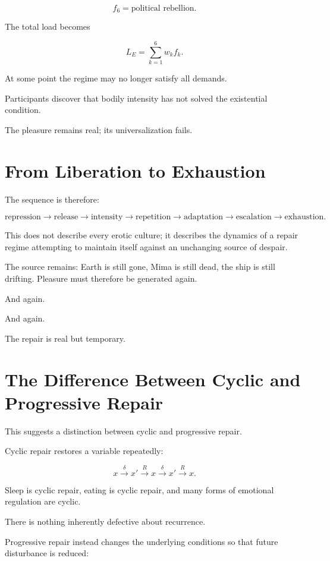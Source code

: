 \documentclass[11pt,oneside]{book}
\theoremstyle{definition}
\theoremstyle{remark}
\begin{document}
\[
f_6=\text{political rebellion}.
\]

The total load becomes

\[
L_E
=
\sum_{k=1}^{6}w_k f_k.
\]

At some point the regime may no longer satisfy all demands.

Participants discover that bodily intensity has not solved the existential condition.

The pleasure remains real; its universalization fails.

\section{From Liberation to Exhaustion}

The sequence is therefore:

\[
\text{repression}
\rightarrow
\text{release}
\rightarrow
\text{intensity}
\rightarrow
\text{repetition}
\rightarrow
\text{adaptation}
\rightarrow
\text{escalation}
\rightarrow
\text{exhaustion}.
\]

This does not describe every erotic culture; it describes the dynamics of a repair regime attempting to maintain itself against an unchanging source of despair.

The source remains: Earth is still gone, Mima is still dead, the ship is still drifting. Pleasure must therefore be generated again.

And again.

And again.

The repair is real but temporary.

\section{The Difference Between Cyclic and Progressive Repair}

This suggests a distinction between cyclic and progressive repair.

Cyclic repair restores a variable repeatedly:

\[
x
\xrightarrow{\delta}
x'
\xrightarrow{R}
x
\xrightarrow{\delta}
x'
\xrightarrow{R}
x.
\]

Sleep is cyclic repair, eating is cyclic repair, and many forms of emotional regulation are cyclic.

There is nothing inherently defective about recurrence.

Progressive repair instead changes the underlying conditions so that future disturbance is reduced:
\end{document}
